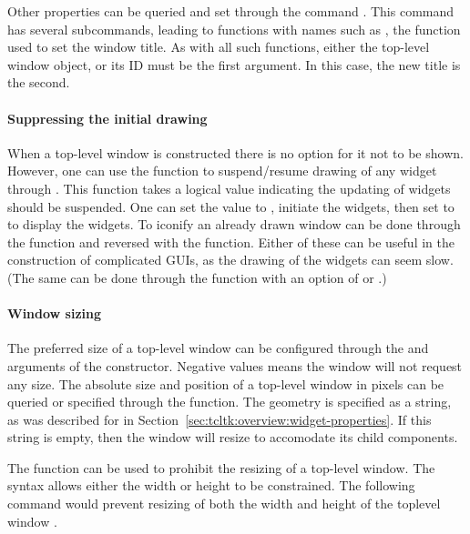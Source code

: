 Other properties can be queried and set through the \TK\/ command
. This command has several subcommands, leading to
 functions with names such as , the
function used to set the window title. As with all such functions,
either the top-level window object, or its ID must be the first
argument. In this case, the new title is the second.

\paragraph{Suppressing the initial drawing}
When a top-level window is constructed there is no option for it not
to be shown.  However, one can use the 
function to suspend/resume drawing of any widget through \TK. This
function takes a logical value indicating the updating of widgets
should be suspended. One can set the value to , initiate
the widgets, then set to  to display the widgets. To
iconify an already drawn window can be done through the
 function and reversed with the
 function. Either of these can be useful in
the construction of complicated GUIs, as the drawing of the widgets
can seem slow. (The same can be done through the 
function with an option of  or .)
 


\paragraph{Window sizing}

The preferred size of a top-level window can be configured through the
 and  arguments of the constructor.  Negative
values means the window will not request any size. The absolute size
and position of a top-level window in pixels can be queried or
specified through the  function. The geometry
is specified as a string, as was described for  in
Section~\ref{sec:tcltk:overview:widget-properties}. If this string is
empty, then the window will resize to accomodate its child components.

The  function can be used to prohibit the
resizing of a top-level window. The syntax allows either the width or
height to be constrained. The following command would  prevent
resizing of both the width and height of the toplevel window . 


